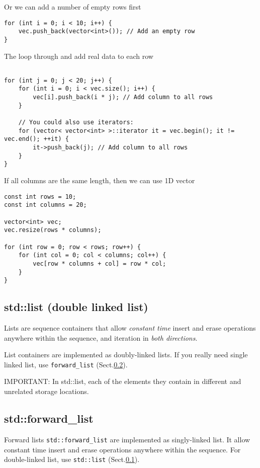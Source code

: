Or we can add a number of empty rows first
\begin{verbatim}
for (int i = 0; i < 10; i++) {
    vec.push_back(vector<int>()); // Add an empty row
}
\end{verbatim}

The loop through and add real data to each row
\begin{verbatim}

for (int j = 0; j < 20; j++) {
    for (int i = 0; i < vec.size(); i++) {
        vec[i].push_back(i * j); // Add column to all rows
    }

    // You could also use iterators:
    for (vector< vector<int> >::iterator it = vec.begin(); it != vec.end(); ++it) {
        it->push_back(j); // Add column to all rows
    }
}
\end{verbatim}

If all columns are the same length, then we can use 1D vector
\begin{verbatim}
const int rows = 10;
const int columns = 20;

vector<int> vec;
vec.resize(rows * columns);

for (int row = 0; row < rows; row++) {
    for (int col = 0; col < columns; col++) {
        vec[row * columns + col] = row * col;
    }
}
\end{verbatim}




\subsection{std::list (double linked list)}
\label{sec:std::list}

Lists are sequence containers that allow {\it constant time} insert and erase
operations anywhere within the sequence, and iteration in {\it both directions}.

List containers are implemented as doubly-linked lists.
If you really need single linked list, use \verb!forward_list!
(Sect.\ref{sec:std::forward_list}).

IMPORTANT:  In std::list, each of the elements they contain in different and
unrelated storage locations.

\subsection{std::forward\_list}
\label{sec:std::forward_list}


Forward lists \verb!std::forward_list! are implemented as singly-linked list.
It allow constant time insert and erase operations anywhere within the sequence.
For double-linked list, use \verb!std::list! (Sect.\ref{sec:std::list}).

